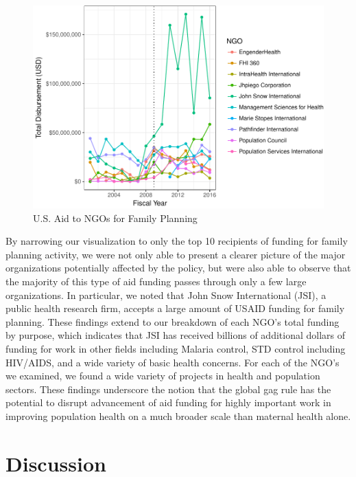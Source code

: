 \documentclass[11pt,]{article}
\makeatletter
\def\maxwidth{\ifdim\Gin@nat@width>\linewidth\linewidth
\else\Gin@nat@width\fi}
\let\Oldincludegraphics\includegraphics
\renewcommand{\includegraphics}[1]{\Oldincludegraphics[width=\maxwidth]{#1}}
\makeatother
\begin{document}
\begin{figure}
\centering
\includegraphics{final-paper_files/figure-latex/unnamed-chunk-3-1.pdf}
\caption{U.S. Aid to NGOs for Family Planning}
\end{figure}

By narrowing our visualization to only the top 10 recipients of funding
for family planning activity, we were not only able to present a clearer
picture of the major organizations potentially affected by the policy,
but were also able to observe that the majority of this type of aid
funding passes through only a few large organizations. In particular, we
noted that John Snow International (JSI), a public health research firm,
accepts a large amount of USAID funding for family planning. These
findings extend to our breakdown of each NGO's total funding by purpose,
which indicates that JSI has received billions of additional dollars of
funding for work in other fields including Malaria control, STD control
including HIV/AIDS, and a wide variety of basic health concerns. For
each of the NGO's we examined, we found a wide variety of projects in
health and population sectors. These findings underscore the notion that
the global gag rule has the potential to disrupt advancement of aid
funding for highly important work in improving population health on a
much broader scale than maternal health alone.

\section{Discussion}\label{discussion}
\end{document}

